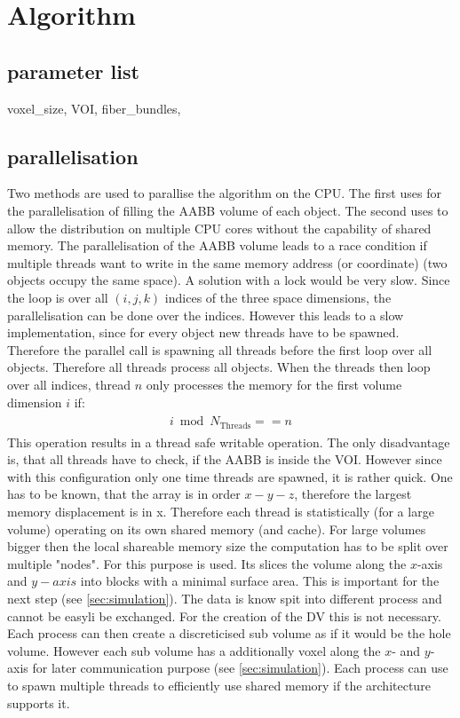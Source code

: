 \section{Algorithm}
% 
\subsection{parameter list}
% 
voxel\_size, VOI, fiber\_bundles, \dummy
% 
\subsection{parallelisation}
% 
Two methods are used to parallise the algorithm on the \ac{CPU}.
The first uses \openmp for the parallelisation of filling the \ac{AABB} volume of each object.
The second uses \mpi to allow the distribution on multiple \ac{CPU} cores without the capability of shared memory. 
% 
The parallelisation of the \ac{AABB} volume leads to a race condition if multiple threads want to write in the same memory address (or coordinate) (\eg two objects occupy the same space).
A solution with a lock would be very slow.
Since the loop is over all $(i,j,k)$ indices of the three space dimensions, the parallelisation can be done over the indices.
However this leads to a slow implementation, since for every object new threads have to be spawned.
Therefore the parallel call is spawning all threads before the first loop over all objects.
Therefore all threads process all objects.
When the threads then loop over all indices, thread $n$ only processes the memory for the first volume dimension $i$ if:
\begin{align}
\begin{split}
    i \bmod N_{\text{Threads}} == n
\end{split}
\end{align}
% 
This operation results in a thread safe writable operation.
The only disadvantage is, that all threads have to check, if the \ac{AABB} is inside the \ac{VOI}.
However since with this configuration only one time threads are spawned, it is rather quick.
One has to be known, that the array is in order $x-y-z$, therefore the largest memory displacement is in x.
Therefore each thread is statistically (for a large volume) operating on its own shared memory (and cache).
% 
For large volumes bigger then the local shareable memory size the computation has to be split over multiple "nodes".
For this purpose \mpi is used.
Its slices the volume along the $x$-axis and $y-axis$ into blocks with a minimal surface area.
This is important for the next step (see \cref{sec:simulation}).
The data is know spit into different process and cannot be easyli be exchanged.
For the creation of the DV this is not necessary.
Each \mpi process can then create a discreticised sub volume as if it would be the hole volume.
However each sub volume has a additionally voxel along the $x$- and $y$-axis for later communication purpose (see \cref{sec:simulation}).
Each \mpi process can use \openmp to spawn multiple threads to efficiently use shared memory if the architecture supports it.
% 
% 
% 
